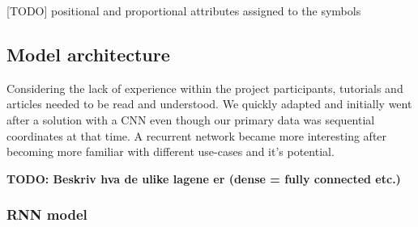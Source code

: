 
[TODO] positional and proportional attributes assigned to the symbols


\subsection{Model architecture} %
Considering the lack of experience within the project participants, tutorials and articles needed to be read and understood. We quickly adapted and initially went after a solution with a CNN even though our primary data was sequential coordinates at that time. A recurrent network became more interesting after becoming more familiar with different use-cases and it's potential.

\textbf{TODO: Beskriv hva de ulike lagene er (dense = fully connected etc.)}

\subsubsection{RNN model}

